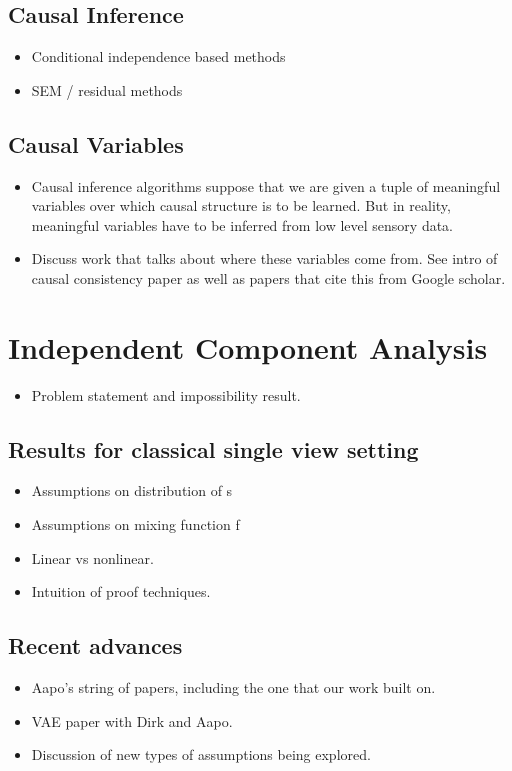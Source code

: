 \subsection{Causal Inference}
\begin{itemize}
\item Conditional independence based methods
\item SEM / residual methods
\end{itemize}

\subsection{Causal Variables}
\begin{itemize}
\item Causal inference algorithms suppose that we are given a tuple of meaningful variables over which causal structure is to be learned. But in reality, meaningful variables have to be inferred from low level sensory data. 
\item Discuss work that talks about where these variables come from. See intro of causal consistency paper as well as papers that cite this from Google scholar.
\end{itemize}


\section{Independent Component Analysis}

\begin{itemize}
\item Problem statement and impossibility result.
\end{itemize}

\subsection{Results for classical single view setting}

\begin{itemize}
\item Assumptions on distribution of s
\item Assumptions on mixing function f
\item Linear vs nonlinear.
\item Intuition of proof techniques.
\end{itemize}

\subsection{Recent advances}
\begin{itemize}
\item Aapo's string of papers, including the one that our work built on.
\item VAE paper with Dirk and Aapo.
\item Discussion of new types of assumptions being explored.
\end{itemize}




